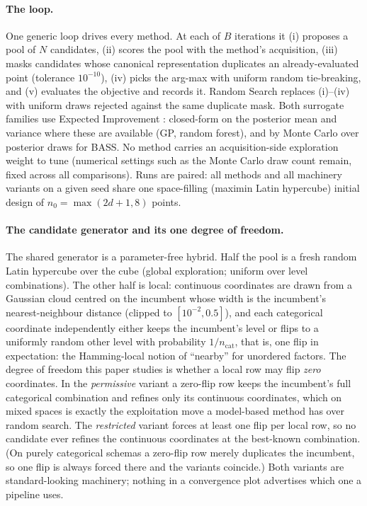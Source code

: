 \documentclass[%
 aip,
 amsmath,amssymb,
 floatfix,
 reprint,%
]{revtex4-1}
\begin{document}
\paragraph{The loop.}
One generic loop drives every method. At each of $B$ iterations it (i)
proposes a pool of $N$ candidates, (ii) scores the pool with the method's
acquisition, (iii) masks candidates whose canonical representation
duplicates an already-evaluated point (tolerance $10^{-10}$), (iv) picks
the arg-max with uniform random tie-breaking, and (v) evaluates the
objective and records it. Random Search replaces (i)--(iv) with uniform
draws rejected against the same duplicate mask. Both surrogate families
use Expected Improvement \cite{jones1998efficient}: closed-form on the
posterior mean and variance where these are available (GP, random
forest), and by Monte Carlo over posterior draws for BASS. No method
carries an acquisition-side exploration weight to tune (numerical
settings such as the Monte Carlo draw count remain, fixed across all
comparisons). Runs are paired: all methods
and all machinery variants on a given seed share one space-filling
(maximin Latin hypercube) initial design of $n_0 = \max(2d{+}1, 8)$
points.

\paragraph{The candidate generator and its one degree of freedom.}
The shared generator is a parameter-free hybrid. Half the pool is a fresh
random Latin hypercube over the cube (global exploration; uniform over
level combinations). The other half is local: continuous coordinates are
drawn from a Gaussian cloud centred on the incumbent whose width is the
incumbent's nearest-neighbour distance (clipped to $[10^{-2}, 0.5]$), and
each categorical coordinate independently either keeps the incumbent's
level or flips to a uniformly random other level with probability
$1/n_{\mathrm{cat}}$, that is, one flip in expectation: the Hamming-local
notion of ``nearby'' for unordered factors. The degree of freedom this
paper studies is whether a local row may flip \emph{zero} coordinates. In
the \emph{permissive} variant a zero-flip row keeps the incumbent's full
categorical combination and refines only its continuous coordinates,
which on mixed spaces is exactly the exploitation move a model-based
method has over random search. The \emph{restricted} variant forces at least one
flip per local row, so no candidate ever refines the continuous
coordinates at the best-known combination. (On purely categorical
schemas a zero-flip row merely duplicates the incumbent, so one flip is
always forced there and the variants coincide.) Both variants are
standard-looking machinery; nothing in a convergence plot advertises
which one a pipeline uses.
\end{document}
